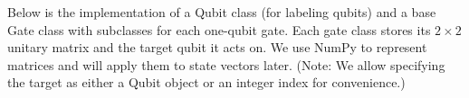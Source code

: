 \documentclass[%
oneside,                 %
final,                   %
10pt]{article}
\begin{document}
Below is the implementation of a Qubit class (for labeling qubits) and
a base Gate class with subclasses for each one-qubit gate. Each gate
class stores its $2\times 2$ unitary matrix and the target qubit it
acts on. We use NumPy to represent matrices and will apply them to
state vectors later. (Note: We allow specifying the target as either a
Qubit object or an integer index for convenience.)
\end{document}
